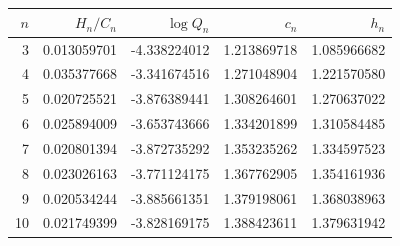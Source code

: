 \begin{tabular}{rrrrr}
\toprule
$n$ & $H_n/C_n$ & $\log Q_n$ & $c_n$ & $h_n$ \\
\midrule
3 & 0.013059701 & -4.338224012 & 1.213869718 & 1.085966682 \\
4 & 0.035377668 & -3.341674516 & 1.271048904 & 1.221570580 \\
5 & 0.020725521 & -3.876389441 & 1.308264601 & 1.270637022 \\
6 & 0.025894009 & -3.653743666 & 1.334201899 & 1.310584485 \\
7 & 0.020801394 & -3.872735292 & 1.353235262 & 1.334597523 \\
8 & 0.023026163 & -3.771124175 & 1.367762905 & 1.354161936 \\
9 & 0.020534244 & -3.885661351 & 1.379198061 & 1.368038963 \\
10 & 0.021749399 & -3.828169175 & 1.388423611 & 1.379631942 \\
\bottomrule
\end{tabular}
